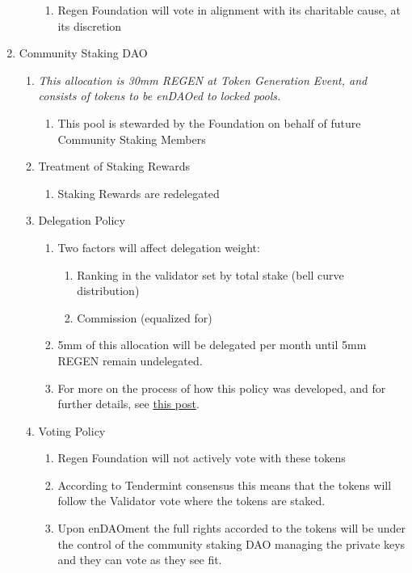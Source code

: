 \documentclass{article}
\begin{document}
\begin{enumerate}
\begin{enumerate}
\begin{enumerate}
\item Regen Foundation will vote in alignment with its charitable cause, at its discretion
\end{enumerate}
\end{enumerate}
\item Community Staking DAO
\begin{enumerate}
\item {\it This allocation is 30mm REGEN at Token Generation Event, and consists of tokens to be enDAOed to locked pools.}
\begin{enumerate}
\item This pool is stewarded by the Foundation on behalf of future Community Staking Members
\end{enumerate}
\item Treatment of Staking Rewards
\begin{enumerate}
\item Staking Rewards are redelegated
\end{enumerate}
\item Delegation Policy
\begin{enumerate}
\item Two factors will affect delegation weight:
\begin{enumerate}
\item Ranking in the validator set by total stake (bell curve distribution)
\item Commission (equalized for)
\end{enumerate}
\item 5mm of this allocation will be delegated per month until 5mm REGEN remain undelegated.
\item For more on the process of how this policy was developed, and for further details, see \href{https://regen.foundation/attending-to-stake-distribution-and-validator-economics/}{this post}.
\end{enumerate}
\item Voting Policy
\begin{enumerate}
\item Regen Foundation will not actively vote with these tokens
\item According to Tendermint consensus this means that the tokens will follow the Validator vote where the tokens are staked.  
\item Upon enDAOment the full rights accorded to the tokens will be under the control of the community staking DAO managing the private keys and they can vote as they see fit.
\end{enumerate}

\end{enumerate}
\end{enumerate}
\end{document}
